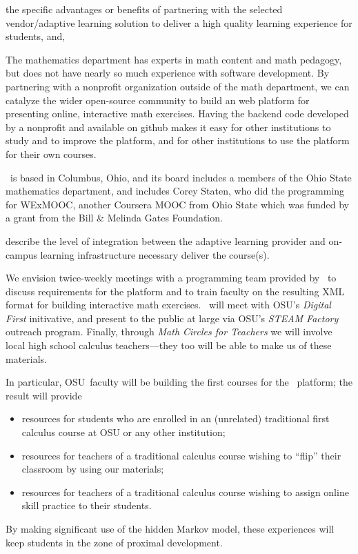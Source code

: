 \begin{subquestion}
 the specific advantages or benefits of partnering with the
 selected vendor/adaptive learning solution to deliver a high quality
 learning experience for students, and,
\end{subquestion}

The mathematics department has experts in math content and math
pedagogy, but does not have nearly so much experience with software
development.  By partnering with a nonprofit organization outside of
the math department, we can catalyze the wider open-source community
to build an web platform for presenting online, interactive math
exercises.  Having the backend code developed by a nonprofit and
available on github makes it easy for other institutions to study and
to improve the platform, and for other institutions to use the
platform for their own courses.

\gratisu\ is based in Columbus, Ohio, and its board includes a members
of the Ohio State mathematics department, and includes Corey Staten,
who did the programming for WExMOOC, another Coursera MOOC from Ohio
State which was funded by a grant from the Bill \& Melinda Gates
Foundation.

\begin{subquestion}
 describe the level of integration between the adaptive
 learning provider and on-campus learning infrastructure necessary
 deliver the course(s).
\end{subquestion}

We envision twice-weekly meetings with a programming team provided by
\gratisu\ to discuss requirements for the platform and to train
faculty on the resulting XML format for building interactive math
exercises.  \gratisu\ will meet with OSU's \textsl{Digital First}
initivative, and present to the public at large via OSU's
\textsl{STEAM Factory} outreach program.  Finally, through
\textsl{Math Circles for Teachers} we will involve local high school
calculus teachers---they too will be able to make us of these
materials.

In particular, OSU~faculty will be building the first courses for the \gratisu\ platform; the result will provide
\begin{itemize}
\item resources for students who are enrolled in an (unrelated) traditional first calculus course at OSU or any other institution;
\item resources for teachers of a traditional calculus course wishing to ``flip'' their classroom by using our materials;
\item resources for teachers of a traditional calculus course wishing to assign online skill practice to their students.
\end{itemize}
By making significant use of the hidden Markov model, these
experiences will keep students in the zone of proximal development.

